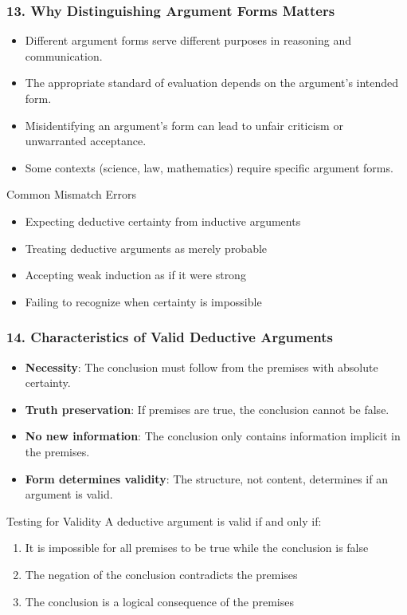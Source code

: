 \documentclass{beamer}
\begin{document}
\begin{frame}
\frametitle{13. Why Distinguishing Argument Forms Matters}
\begin{itemize}
\item Different argument forms serve different purposes in reasoning and communication.
\item The appropriate standard of evaluation depends on the argument's intended form.
\item Misidentifying an argument's form can lead to unfair criticism or unwarranted acceptance.
\item Some contexts (science, law, mathematics) require specific argument forms.

\end{itemize}

\begin{alertblock}{Common Mismatch Errors}
\begin{itemize}
\item Expecting deductive certainty from inductive arguments
\item Treating deductive arguments as merely probable
\item Accepting weak induction as if it were strong
\item Failing to recognize when certainty is impossible
\end{itemize}

\end{alertblock}
\end{frame}

\begin{frame}
\frametitle{14. Characteristics of Valid Deductive Arguments}
\begin{itemize}
\item \textbf{Necessity}: The conclusion must follow from the premises with absolute certainty.
\item \textbf{Truth preservation}: If premises are true, the conclusion cannot be false.
\item \textbf{No new information}: The conclusion only contains information implicit in the premises.
\item \textbf{Form determines validity}: The structure, not content, determines if an argument is valid.
\end{itemize}

\begin{block}{Testing for Validity}
A deductive argument is valid if and only if:
\begin{enumerate}
\item It is impossible for all premises to be true while the conclusion is false
\item The negation of the conclusion contradicts the premises
\item The conclusion is a logical consequence of the premises
\end{enumerate}
\end{block}
\end{frame}
\end{document}
